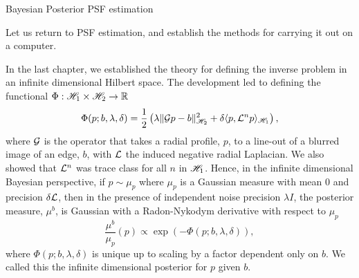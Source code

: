 
\begin{chapter}{Bayesian Posterior PSF estimation} \label{chapter:computational}

\begin{com}
  Let us return to PSF estimation, and establish the methods for carrying it out on a computer.
\end{com}
In the last chapter, we established the theory for defining the inverse problem in an infinite dimensional Hilbert space. 
The development led to defining the functional $\Phi:\mathscr H_1 \times \mathscr H_2 \to \mathbb R$
\begin{equation} \label{eq:regularizingFunctional}
  \Phi(p; b,\lambda,\delta) = \frac 12 \left(\lambda\|\mathcal G p - b\|_{\mathscr H_2}^2 + \delta\langle p, \mathcal L^n p\rangle_{\mathscr H_1}\right),
\end{equation}
where $\mathcal G$ is the operator that takes a radial profile, $p$, to a line-out of a blurred image of an edge, $b$, with $\mathcal L$ the induced negative radial Laplacian. 
We also showed that $\mathcal L^n$ was trace class for all $n$ in $\mathscr H_1$. %
Hence, in the infinite dimensional Bayesian perspective, if $p\sim \mu_p$ where $\mu_p$ is a Gaussian measure with mean $0$ and precision $\delta \mathcal L$, then in the presence of independent noise precision $\lambda I$, the posterior measure, $\mu^b$, is Gaussian with a Radon-Nykodym derivative with respect to $\mu_p$
\begin{equation} \label{eq:posteriorInfinite}
  \frac{\mu^b}{\mu_p}(p) \propto \exp\left(-\Phi(p;b,\lambda,\delta)\right),
\end{equation}
where $\Phi(p;b,\lambda,\delta)$ is unique up to scaling by a factor dependent only on $b$.
We called this the infinite dimensional posterior for $p$ given $b$.


\end{chapter}
